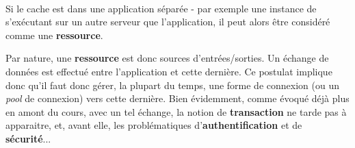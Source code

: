 {\begin{description}
    \paragraph{} Si le cache est dans une application séparée - par exemple une instance de
     s'exécutant sur un autre serveur que l'application, il peut alors être
    considéré comme une \textbf{ressource}.
  \item[entrées/sorties] Par nature, une \textbf{ressource} est donc sources d'entrées/sorties. Un
  échange de données est effectué entre l'application et cette dernière. Ce postulat implique donc
  qu'il faut donc gérer, la plupart du temps, une forme de connexion (ou un \textit{pool} de
  connexion) vers cette dernière. Bien évidemment, comme évoqué déjà plus en amont du cours, avec un
  tel échange, la notion de \textbf{transaction} ne tarde pas à apparaitre, et, avant elle, les
  problématiques d'\textbf{authentification} et de \textbf{sécurité}...
\end{description}
}


